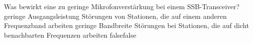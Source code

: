     {Was bewirkt eine zu geringe Mikrofonverstärkung bei einem SSB-Transceiver?}
    {geringe Ausgangsleistung}
    {Störungen von Stationen, die auf einem anderen Frequenzband arbeiten}
    {geringe Bandbreite}
    {Störungen bei Stationen, die auf dicht benachbarten Frequenzen arbeiten}
    {false}{false}